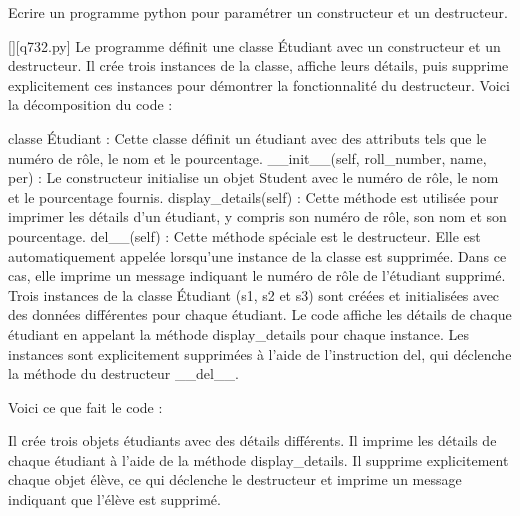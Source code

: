         \question
        Ecrire un programme python pour paramétrer un constructeur et un destructeur.
        \par
        \begin{solution}
            \renewcommand{\nomfichier}{q732.py}
            \pythonfile{\chemincode \nomfichier}[][\nomfichier]
            Le programme définit une classe Étudiant avec un constructeur et un destructeur. Il crée trois instances de la classe, affiche leurs détails, puis supprime explicitement ces instances pour démontrer la fonctionnalité du destructeur. Voici la décomposition du code :

    classe Étudiant : Cette classe définit un étudiant avec des attributs tels que le numéro de rôle, le nom et le pourcentage.
    \_\_init\_\_(self, roll\_number, name, per) : Le constructeur initialise un objet Student avec le numéro de rôle, le nom et le pourcentage fournis.
    display\_details(self) : Cette méthode est utilisée pour imprimer les détails d'un étudiant, y compris son numéro de rôle, son nom et son pourcentage.
    del\_\_(self) : Cette méthode spéciale est le destructeur. Elle est automatiquement appelée lorsqu'une instance de la classe est supprimée. Dans ce cas, elle imprime un message indiquant le numéro de rôle de l'étudiant supprimé.
    Trois instances de la classe Étudiant (s1, s2 et s3) sont créées et initialisées avec des données différentes pour chaque étudiant.
    Le code affiche les détails de chaque étudiant en appelant la méthode display\_details pour chaque instance.
    Les instances sont explicitement supprimées à l'aide de l'instruction del, qui déclenche la méthode du destructeur \_\_del\_\_.

Voici ce que fait le code :

    Il crée trois objets étudiants avec des détails différents.
    Il imprime les détails de chaque étudiant à l'aide de la méthode display\_details.
    Il supprime explicitement chaque objet élève, ce qui déclenche le destructeur et imprime un message indiquant que l'élève est supprimé.
        \end{solution}
        

